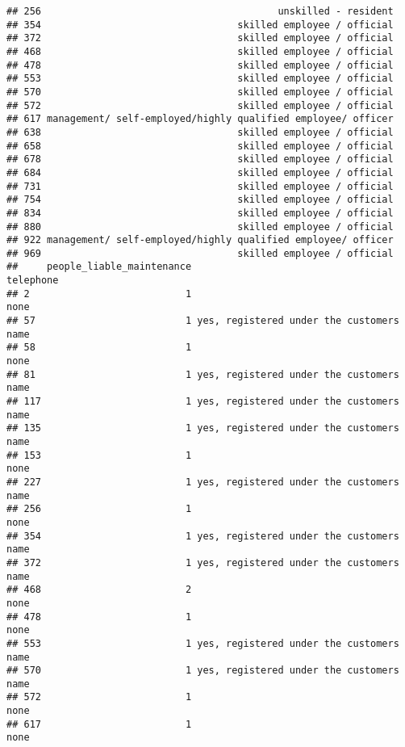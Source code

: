 \documentclass[
]{article}
\begin{document}
\begin{verbatim}
## 256                                         unskilled - resident
## 354                                  skilled employee / official
## 372                                  skilled employee / official
## 468                                  skilled employee / official
## 478                                  skilled employee / official
## 553                                  skilled employee / official
## 570                                  skilled employee / official
## 572                                  skilled employee / official
## 617 management/ self-employed/highly qualified employee/ officer
## 638                                  skilled employee / official
## 658                                  skilled employee / official
## 678                                  skilled employee / official
## 684                                  skilled employee / official
## 731                                  skilled employee / official
## 754                                  skilled employee / official
## 834                                  skilled employee / official
## 880                                  skilled employee / official
## 922 management/ self-employed/highly qualified employee/ officer
## 969                                  skilled employee / official
##     people_liable_maintenance                                telephone
## 2                           1                                     none
## 57                          1 yes, registered under the customers name
## 58                          1                                     none
## 81                          1 yes, registered under the customers name
## 117                         1 yes, registered under the customers name
## 135                         1 yes, registered under the customers name
## 153                         1                                     none
## 227                         1 yes, registered under the customers name
## 256                         1                                     none
## 354                         1 yes, registered under the customers name
## 372                         1 yes, registered under the customers name
## 468                         2                                     none
## 478                         1                                     none
## 553                         1 yes, registered under the customers name
## 570                         1 yes, registered under the customers name
## 572                         1                                     none
## 617                         1                                     none

\end{verbatim}
\end{document}
